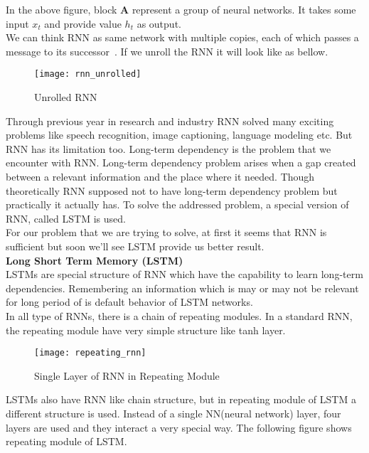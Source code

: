 In the above figure, block $\textbf{A}$ represent a group of neural networks. It takes some input \textbf{$x_t$} and provide value \textbf{$h_t$} as output. \\

We can think RNN as same network with multiple copies, each of which passes a message to its successor~\cite{colah2015}. If we unroll the RNN it will look like as bellow. \\

\begin{figure}[h]
    \centering
    \texttt{[image: rnn\_unrolled]}
    \caption{Unrolled RNN~\cite{colah2015}}
\end{figure}
\vline

Through previous year in research and industry RNN solved many exciting problems like speech recognition, image captioning, language modeling etc. But RNN has its limitation too. Long-term dependency is the problem that we encounter with RNN. Long-term dependency problem arises when a gap created between a relevant information and the place where it needed. Though theoretically RNN supposed not to have long-term dependency problem but practically it actually has. To solve the addressed problem, a special version of RNN, called LSTM is used. \\

For our problem that we are trying to solve, at first it seems that RNN is sufficient but soon we'll see LSTM provide us better result. \\

\textbf{Long Short Term Memory (LSTM)} \\
LSTMs are special structure of RNN which have the capability to learn long-term dependencies. Remembering an information which is may or may not be relevant for long period of is default behavior of LSTM networks. \\

In all type of RNNs, there is a chain of repeating modules. In a standard RNN, the repeating module have very simple structure like tanh layer. \\

\begin{figure}[h]
    \centering
    \texttt{[image: repeating\_rnn]}
    \caption{Single Layer of RNN in Repeating Module~\cite{colah2015}}
\end{figure}
\vline

LSTMs also have RNN like chain structure, but in repeating module of LSTM a different structure is used. Instead of a single NN(neural network) layer, four layers are used and they interact a very special way. The following figure shows repeating module of LSTM. \\


